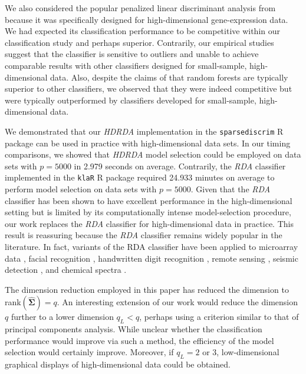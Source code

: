 \documentclass[]{interact}\usepackage[]{graphicx}\usepackage[]{color}
\begin{document}
We also considered the popular penalized linear discriminant analysis from
\cite{Witten:2011kc} because it was specifically designed for high-dimensional
gene-expression data. We had expected its classification performance to be
competitive within our classification study and perhaps superior. Contrarily,
our empirical studies suggest that the classifier is sensitive to outliers and
unable to achieve comparable results with other classifiers designed for
small-sample, high-dimensional data. Also, despite the claims of
\cite{FernandezDelgado:2014ul} that random forests are typically superior to
other classifiers, we observed that they were indeed competitive but were
typically outperformed by classifiers developed for small-sample,
high-dimensional data.

We demonstrated that our \emph{HDRDA} implementation in the {\tt sparsediscrim}
R package can be used in practice with high-dimensional data sets. In our timing
comparisons, we showed that \emph{HDRDA} model selection could be employed on
data sets with $p = 5000$ in 2.979 seconds on
average. Contrarily, the \emph{RDA} classifier implemented in the {\tt klaR} R
package required 24.933 minutes on average to perform model
selection on data sets with $p = 5000$. Given that the \emph{RDA} classifier has
been shown to have excellent performance in the high-dimensional setting
\citep{Webb:2011vu} but is limited by its computationally intense
model-selection procedure, our work replaces the \emph{RDA} classifier for
high-dimensional data in practice. This result is reassuring because the
\emph{RDA} classifier remains widely popular in the literature. In fact,
variants of the RDA classifier have been applied to microarray data
\citep{Ching:2012fu,Li:2012ev,Tai:2007bk,Guo:2007te}, facial recognition
\citep{Zhang:2010va,Dai:2007vd,Lu:2005hq,Pima:2004vw,Lu:2003we}, handwritten
digit recognition \citep{Bouveyron:2007gx}, remote sensing
\citep{Tadjudin:1999fk}, seismic detection \citep{Anderson:2002kg}, and chemical
spectra \citep{Wu:1996us,Aeberhard:1993fp}.

The dimension reduction employed in this paper has reduced the dimension to
rank$(\widehat{\bm \Sigma}) = q$. An interesting extension of our work would
reduce the dimension $q$ further to a lower dimension $q_L < q$, perhaps using a
criterion similar to that of principal components analysis. While unclear
whether the classification performance would improve via such a method, the
efficiency of the model selection would certainly improve. Moreover, if $q_L =
2$ or $3$, low-dimensional graphical displays of high-dimensional data could be
obtained.
\end{document}
